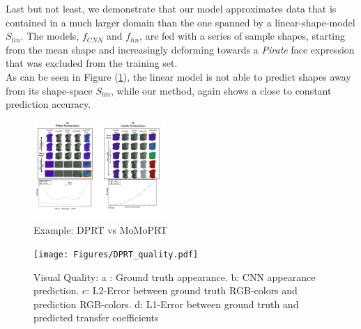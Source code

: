 Last but not least, we demonstrate that our model approximates data that is contained in a much larger domain than the one spanned by a linear-shape-model $S_{lin}$. The models, $f_{CNN}$ and $f_{lin}$, are fed with a series of sample shapes, starting from the mean shape and increasingly deforming towards a \textit{Pirate} face expression that was excluded from the training set. \\
As can be seen in Figure (\ref{Fig:DPRT vs MoMoPRT B}), the linear model is not able to predict shapes away from its shape-space $S_{lin}$, while our method, again shows a close to constant prediction accuracy.
\begin{figure}[H]
  \centering
    \includegraphics[width=0.45\textwidth]{Figures/DPRT_vs_MoMoPRT_b.pdf}
     \caption{Example: DPRT vs MoMoPRT}
     \label{Fig:DPRT vs MoMoPRT B}
\end{figure}
\begin{figure}
  \centering
    \texttt{[image: Figures/DPRT\_quality.pdf]}
     \caption{Visual Quality:
     a : Ground truth appearance. b: CNN appearance prediction. c: L2-Error between ground truth RGB-colors and prediction RGB-colors. d: L1-Error between ground truth and predicted transfer coefficients }
     \label{Fig: DPRT_Quality}
\end{figure}
\newpage